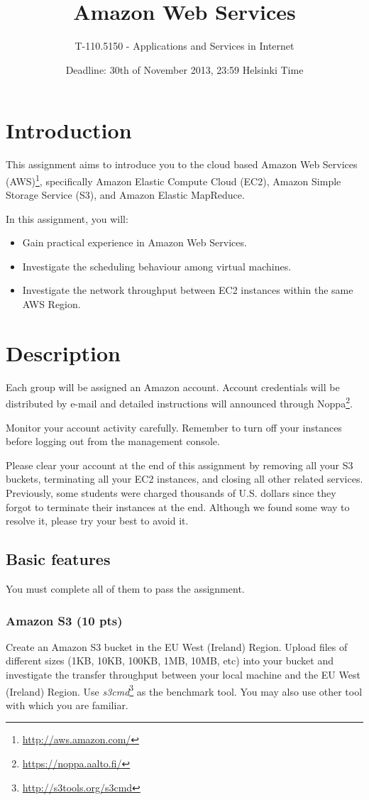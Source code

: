 \documentclass[12pt, a4paper]{article}
\title{Amazon Web Services}
\author{T-110.5150 - Applications and Services in Internet}
\date{Deadline: 30th of November 2013, 23:59 Helsinki Time}
\begin{document}
\maketitle
\section{Introduction}

This assignment aims to introduce you to the cloud based Amazon Web Services (AWS)\footnote{\url{http://aws.amazon.com/}}, specifically Amazon Elastic Compute Cloud (EC2), Amazon Simple Storage Service (S3), and Amazon Elastic MapReduce.

In this assignment, you will:
\begin{itemize}
\item Gain practical experience in Amazon Web Services.
\item Investigate the scheduling behaviour among virtual machines.
\item Investigate the network throughput between EC2 instances within the same AWS Region.
\end{itemize}

\section{Description}
Each group will be assigned an Amazon account.
Account credentials will be distributed by e-mail and detailed instructions will announced through Noppa\footnote{\url{https://noppa.aalto.fi/}}.

Monitor your account activity carefully.
Remember to turn off your instances before logging out from the management console.

Please clear your account at the end of this assignment by removing all your S3 buckets, terminating all your EC2 instances, and closing all other related services.
Previously, some students were charged thousands of U.S. dollars since they forgot to terminate their instances at the end.
Although we found some way to resolve it, please try your best to avoid it.


\subsection{Basic features}
You must complete all of them to pass the assignment.

\subsubsection{Amazon S3 (10 pts)}
Create an Amazon S3 bucket in the EU West (Ireland) Region.
Upload files of different sizes (1KB, 10KB, 100KB, 1MB, 10MB, etc) into your bucket and investigate the transfer throughput between your local machine and the EU West (Ireland) Region.
Use \emph{s3cmd}\footnote{\url{http://s3tools.org/s3cmd}} as the benchmark tool.
You may also use other tool with which you are familiar.
\end{document}
